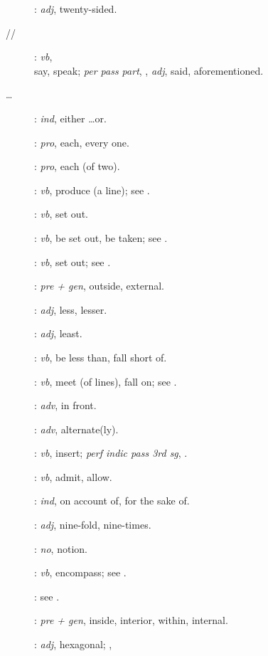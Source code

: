 {\begin{description}
\item[]: {\em adj}, twenty-sided.
\item[//]: {\em vb},\\  say, speak; {\em per pass part}, , {\em adj}, said, aforementioned.
\item[ \ldots {}]: {\em ind}, either \ldots or.
\item[]: {\em pro}, each, every one.
\item[]: {\em pro}, each (of two).
\item[]: {\em vb},  produce (a line); see . 
\item[]: {\em vb}, set out.
\item[]: {\em vb}, be set out, be taken; see .
\item[]: {\em vb}, set out; see .
\item[]: {\em pre + gen}, outside, external.
\item[]: {\em adj}, less, lesser.
\item[]: {\em adj}, least.
\item[]: {\em vb}, be less than, fall short of.
\item[]: {\em vb}, meet (of lines), fall on; see .
\item[]: {\em adv}, in front.
\item[]: {\em adv}, alternate(ly).
\item[]: {\em vb}, insert; {\em perf indic pass 3rd sg}, .
\item[]: {\em vb}, admit, allow.
\item[]: {\em ind}, on account of, for the sake of.
\item[]: {\em adj}, nine-fold, nine-times.
\item[]: {\em no}, notion.
\item[]: {\em vb}, encompass; see .
\item[]: see .
\item[]: {\em pre + gen}, inside, interior, within, internal.
\item[]: {\em adj}, hexagonal; ,

\end{description}}
